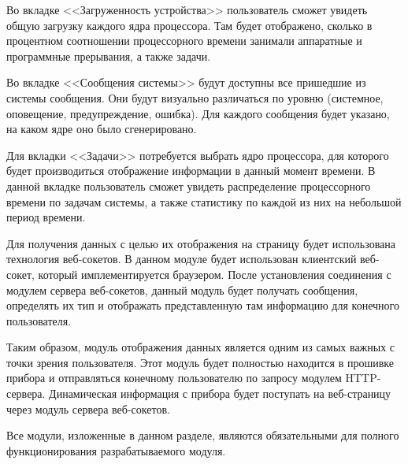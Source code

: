 Во вкладке <<Загруженность устройства>> пользователь сможет увидеть общую загрузку
каждого ядра процессора. Там будет отображено, сколько в процентном соотношении
процессорного времени занимали аппаратные и программные прерывания, а также задачи.

Во вкладке <<Сообщения системы>> будут доступны все пришедшие из системы сообщения.
Они будут визуально различаться по уровню (системное, оповещение, предупреждение,
ошибка). Для каждого сообщения будет указано, на каком ядре оно было сгенерировано.

Для вкладки <<Задачи>> потребуется выбрать ядро процессора, для которого будет
производиться отображение информации в данный момент времени. В данной вкладке
пользователь сможет увидеть распределение процессорного времени по задачам системы,
а также статистику по каждой из них на небольшой период времени.

Для получения данных с целью их отображения на страницу будет использована
технология веб-сокетов. В данном модуле будет использован клиентский веб-сокет,
который имплементируется браузером. После установления соединения с модулем
сервера веб-сокетов, данный модуль будет получать сообщения, определять их тип
и отображать представленную там информацию для конечного пользователя.

Таким образом, модуль отображения данных является одним из самых важных с точки
зрения пользователя. Этот модуль будет полностью находится в прошивке прибора
и отправляться конечному пользователю по запросу модулем HTTP-сервера.
Динамическая информация с прибора будет поступать на веб-страницу через модуль
сервера веб-сокетов.

Все модули, изложенные в данном разделе, являются обязательными для
полного функционирования разрабатываемого модуля.
